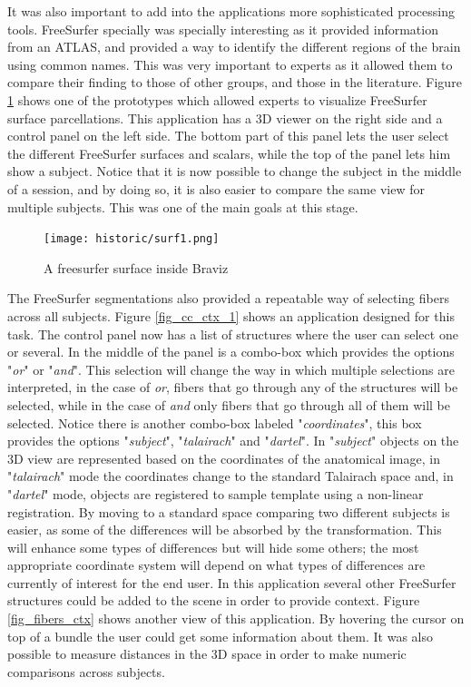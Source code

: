 It was also important to add into the applications more sophisticated processing tools. FreeSurfer specially was specially interesting as it provided information from an ATLAS, and provided a way to identify the different regions of the brain using common names. This was very important to experts as it allowed them to compare their finding to those of other groups, and those in the literature. Figure \ref{fig_surf_1} shows one of the prototypes which allowed experts to visualize FreeSurfer surface parcellations. This application has a 3D viewer on the right side and a control panel on the left side. The bottom part of this panel lets the user select the different FreeSurfer surfaces and scalars, while the top of the panel lets him show a subject. Notice that it is now possible to change the subject in the middle of a session, and by doing so, it is also easier to compare the same view for multiple subjects. This was one of the main goals at this stage.

\begin{figure}
\centering
\texttt{[image: historic/surf1.png]}
\caption{\label{fig_surf_1}A freesurfer surface inside Braviz}
\end{figure}

The FreeSurfer segmentations also provided a repeatable way of selecting fibers across all subjects. Figure \ref{fig_cc_ctx_1} shows an application designed for this task. The control panel now has a list of structures where the user can select one or several. In the middle of the panel is a combo-box which provides the options "\emph{or}" or "\emph{and}". This selection will change the way in which multiple selections are interpreted, in the case of \emph{or}, fibers that go through any of the structures will be selected, while in the case of \emph{and} only fibers that go through all of them will be selected. Notice there is another combo-box labeled "\emph{coordinates}", this box provides the options "\emph{subject}", "\emph{talairach}" and "\emph{dartel}". In "\emph{subject}" objects on the 3D view are represented based on the coordinates of the anatomical image, in "\emph{talairach}" mode the coordinates change to the standard Talairach space and, in "\emph{dartel}" mode, objects are registered to sample template using a non-linear registration. By moving to a standard space comparing two different subjects is easier, as some of the differences will be absorbed by the transformation. This will enhance some types of differences but will hide some others; the most appropriate coordinate system will depend on what types of differences are currently of interest for the end user. In this application several other FreeSurfer structures could be added to the scene in order to provide context. Figure \ref{fig_fibers_ctx} shows another view of this application. By hovering the cursor on top of a bundle the user could get some information about them. It was also possible to measure distances in the 3D space in order to make numeric comparisons across subjects.

